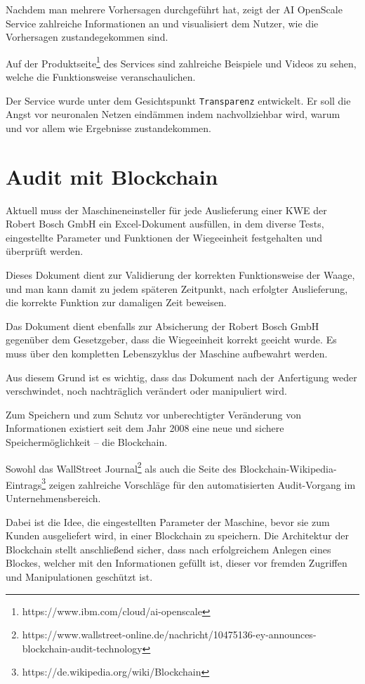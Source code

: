 Nachdem man mehrere Vorhersagen durchgeführt hat, zeigt der AI OpenScale Service zahlreiche Informationen an und
visualisiert dem Nutzer, wie die Vorhersagen zustandegekommen sind.

Auf der Produktseite\footnote{https://www.ibm.com/cloud/ai-openscale} des Services sind zahlreiche Beispiele und Videos
zu sehen, welche die Funktionsweise veranschaulichen.

Der Service wurde unter dem Gesichtspunkt \texttt{Transparenz} entwickelt. Er soll die Angst vor neuronalen Netzen
eindämmen indem nachvollziehbar wird, warum und vor allem wie Ergebnisse zustandekommen.

\section{Audit mit Blockchain}
Aktuell muss der Maschineneinsteller für jede Auslieferung einer KWE der Robert Bosch GmbH ein Excel-Dokument ausfüllen,
in dem diverse Tests, eingestellte Parameter und Funktionen der Wiegeeinheit festgehalten und überprüft werden.

Dieses Dokument dient zur Validierung der korrekten Funktionsweise der Waage, und man kann damit zu jedem späteren
Zeitpunkt, nach erfolgter Auslieferung, die korrekte Funktion zur damaligen Zeit beweisen.

Das Dokument dient ebenfalls zur Absicherung der Robert Bosch GmbH gegenüber dem Gesetzgeber, dass die Wiegeeinheit
korrekt geeicht wurde. Es muss über den kompletten Lebenszyklus der Maschine aufbewahrt werden.

Aus diesem Grund ist es wichtig, dass das Dokument nach der Anfertigung weder verschwindet, noch nachträglich verändert
oder manipuliert wird.

Zum Speichern und zum Schutz vor unberechtigter Veränderung von Informationen existiert seit dem Jahr 2008 eine neue
und sichere Speichermöglichkeit -- die Blockchain.

Sowohl das WallStreet
Journal\footnote{https://www.wallstreet-online.de/nachricht/10475136-ey-announces-blockchain-audit-technology} als auch
die Seite des Blockchain-Wikipedia-Eintrags\footnote{https://de.wikipedia.org/wiki/Blockchain} zeigen zahlreiche
Vorschläge für den automatisierten Audit-Vorgang im Unternehmensbereich.

Dabei ist die Idee, die eingestellten Parameter der Maschine, bevor sie zum Kunden ausgeliefert wird, in einer
Blockchain zu speichern. Die Architektur der Blockchain stellt anschließend sicher, dass nach erfolgreichem Anlegen
eines Blockes, welcher mit den Informationen gefüllt ist, dieser vor fremden Zugriffen und Manipulationen geschützt ist.


